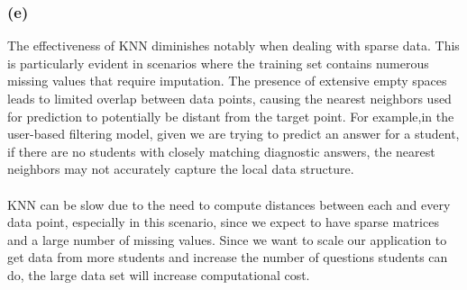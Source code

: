 \documentclass{article}
\begin{document}
\subsubsection{(e)}
The effectiveness of KNN diminishes notably when dealing with sparse data. This is particularly evident in scenarios where the training set contains numerous missing values that require imputation. The presence of extensive empty spaces leads to limited overlap between data points, causing the nearest neighbors used for prediction to potentially be distant from the target point. For example,in the user-based filtering model, given we are trying to predict an answer for a student, if there are no students with closely matching diagnostic answers, the nearest neighbors may not accurately capture the local data structure.\\
\\
KNN can be slow due to the need to compute distances between each and every data point, especially in this scenario, since we expect to have sparse matrices and a large number of missing values. Since we want to scale our application to get data from more students and increase the number of questions students can do, the large data set will increase computational cost. \\
\\
\newpage
\subsection{}
\end{document}
